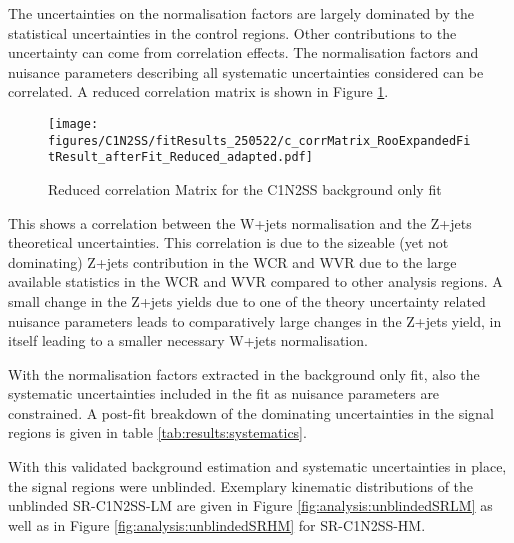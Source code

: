 The uncertainties on the normalisation factors are largely dominated by the statistical uncertainties in the control regions.  Other contributions to the uncertainty can come from correlation effects. 
The normalisation factors and nuisance parameters describing all systematic uncertainties considered can be correlated.  A reduced correlation matrix is shown in Figure \ref{fig:analysis:corrMatrix}. 

\begin{figure}[htpb!]
 \centering
 \texttt{[image: figures/C1N2SS/fitResults\_250522/c\_corrMatrix\_RooExpandedFitResult\_afterFit\_Reduced\_adapted.pdf]}
 \caption{Reduced correlation Matrix for the C1N2SS background only fit \label{fig:analysis:corrMatrix} }
 \end{figure}

This shows a correlation between the W+jets normalisation and the Z+jets theoretical uncertainties. This correlation is due to the sizeable (yet not dominating) Z+jets contribution in the WCR and WVR due to the large available statistics in the WCR and WVR compared to other analysis regions.  A small change in the Z+jets yields due to one of the theory uncertainty related nuisance parameters leads to comparatively large changes in the Z+jets yield,  in itself leading to a smaller necessary W+jets normalisation. 



With the normalisation factors extracted in the background only fit, also the systematic uncertainties included in the fit as nuisance parameters are constrained.  A post-fit breakdown of the dominating uncertainties in the signal regions is given in table \ref{tab:results:systematics}.


With this validated background estimation and systematic uncertainties in place, the signal regions were unblinded. 
Exemplary kinematic distributions of the unblinded SR-C1N2SS-LM are given in Figure \ref{fig:analysis:unblindedSRLM} as well as in Figure \ref{fig:analysis:unblindedSRHM} for SR-C1N2SS-HM.


